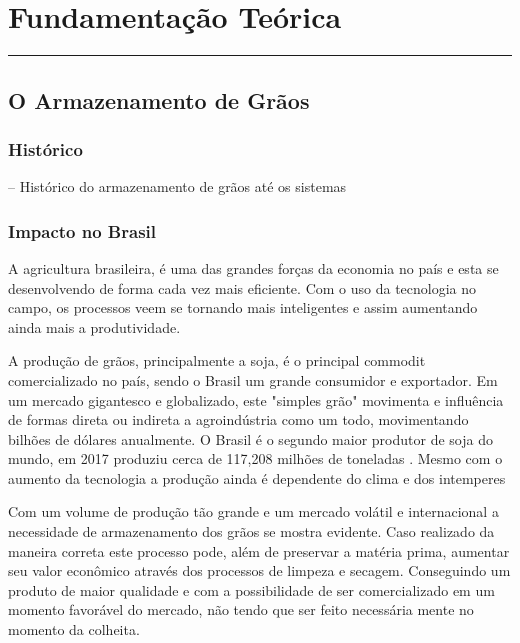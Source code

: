 \chapter{Fundamentação Teórica}\label{chp:fundament}
\vspace{-1.5cm}
\noindent\rule{\columnwidth}{1.2mm}



\section{O Armazenamento de Grãos}

\subsection{Histórico}

-- Histórico do armazenamento de grãos até os sistemas 

\subsection{Impacto no Brasil}

A agricultura brasileira, é uma das grandes forças da economia no país e esta  se desenvolvendo de forma cada vez mais eficiente. Com o uso da tecnologia no campo, os processos veem se tornando mais inteligentes e assim aumentando ainda mais a produtividade. 

A produção de grãos, principalmente a soja, é o principal commodit comercializado no país, sendo o Brasil um grande consumidor e exportador. Em um mercado gigantesco e globalizado, este "simples grão" movimenta e influência de formas direta ou indireta a agroindústria como um todo, movimentando bilhões de dólares anualmente. O Brasil é o segundo maior produtor de soja do mundo, em 2017 produziu cerca de 117,208 milhões de toneladas \cite{embrapa}. Mesmo com o aumento da tecnologia a produção ainda é dependente do clima e dos intemperes


Com um volume de produção tão grande e um mercado volátil e internacional a necessidade de armazenamento dos grãos se mostra evidente. Caso realizado da maneira correta  este processo pode, além de preservar a matéria prima, aumentar seu valor econômico através dos processos de limpeza e secagem. Conseguindo um produto de maior qualidade e com a possibilidade de  ser comercializado em um momento favorável do mercado, não tendo que ser feito necessária mente no momento da colheita.




